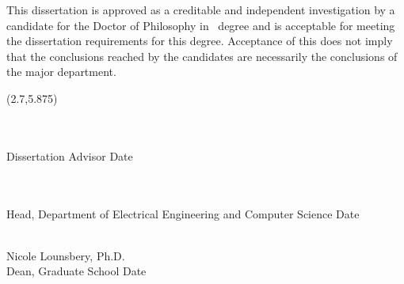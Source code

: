 \documentclass[main.tex]{subfiles}
\begin{document}
\begin{center}
\yourtitle
\end{center}

\par This dissertation is approved as a creditable and independent investigation by a 
candidate for the Doctor of Philosophy in \yourmajor \ degree and is acceptable for 
meeting the dissertation requirements for this degree. Acceptance of this does not imply 
that the conclusions reached by the candidates are necessarily the conclusions of the 
major department.


\singlespacing

\begin{textblock}{8.5}(2.7,5.875)

\underline{\hspace{4.2in}}\\
\youradvisor\\
Dissertation Advisor \hspace{2.43in}Date

\vspace{.75in}

\underline{\hspace{4.2in}}\\
\departmenthead\\
Head, Department of Electrical Engineering and Computer Science \hspace{0.1in}Date

\vspace{.5in}

\underline{\hspace{4.2in}}\\
Nicole Lounsbery, Ph.D.\\
Dean, Graduate School \hspace{2.27in}Date

\end{textblock}
\end{document}
